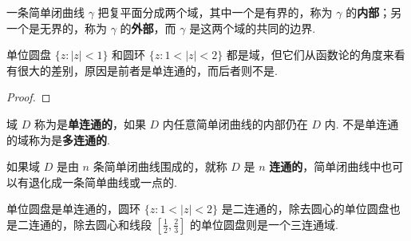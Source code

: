 \documentclass[../../main.tex]{subfiles}
\begin{document}
\begin{theorem}[Jordan定理]\label{theorem:Jordan定理}
一条简单闭曲线 $\gamma$ 把复平面分成两个域，其中一个是有界的，称为 $\gamma$ 的\textbf{内部}；另一个是无界的，称为 $\gamma$ 的\textbf{外部}，而 $\gamma$ 是这两个域的共同的边界.
\end{theorem}
\begin{note}
单位圆盘 $\{ z: \vert z \vert < 1\}$ 和圆环 $\{ z: 1 < \vert z \vert < 2\}$ 都是域，但它们从函数论的角度来看有很大的差别，原因是前者是单连通的，而后者则不是.
\end{note}
\begin{proof}


\end{proof}


\begin{definition}
域 $D$ 称为是\textbf{单连通的}，如果 $D$ 内任意简单闭曲线的内部仍在 $D$ 内. 不是单连通的域称为是\textbf{多连通的}.
\end{definition}

\begin{definition}
如果域 $D$ 是由 $n$ 条简单闭曲线围成的，就称 $D$ 是 $n$ \textbf{连通的}，简单闭曲线中也可以有退化成一条简单曲线或一点的.
\end{definition}

\begin{example}
单位圆盘是单连通的，圆环 $\{ z: 1 < \vert z \vert < 2\}$ 是二连通的，除去圆心的单位圆盘也是二连通的，除去圆心和线段 $\left[ \frac{1}{2}, \frac{2}{3} \right]$ 的单位圆盘则是一个三连通域.
\end{example}
\end{document}
